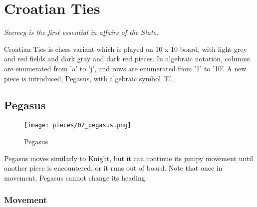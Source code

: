 

\chapter*{Croatian Ties}
\label{ch:Croatian Ties}

\begin{flushright}
\parbox{0.7\textwidth}{
\emph{Secrecy is the first essential in affairs of the State. \\
 } }
\end{flushright}

\noindent
Croatian Ties is chess variant which is played on 10 x 10 board,
with light grey and red fields and dark gray and dark red pieces.
In algebraic notation, columns are enumerated from 'a' to 'j',
and rows are enumerated from '1' to '10'. A new piece is
introduced, Pegasus, with algebraic symbol 'E'.

\clearpage %

\section*{Pegasus}
\label{sec:Croatian Ties/Pegasus}

\noindent
\begin{wrapfigure}[6]{l}{0.4\textwidth}
\centering
\texttt{[image: pieces/07\_pegasus.png]}
\caption{Pegasus}
\label{fig:07_pegasus}
\end{wrapfigure}
Pegasus moves similarly to Knight, but it can continue its jumpy movement
until another piece is encountered, or it runs out of board. Note that once
in movement, Pegasus cannot change its heading.

\vspace{5.0\baselineskip}
\subsection*{Movement}
\label{sec:Croatian Ties/Pegasus/Movement}

